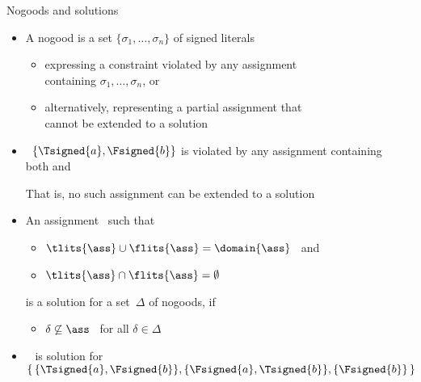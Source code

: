 \begin{frame}{Nogoods and solutions}
  \bigskip
  \begin{itemize}
  \item<2-> A \alert{nogood} is a set $\{\sigma_1,\ldots,\sigma_n\}$ of signed literals
    \begin{itemize}\normalsize
    \item<only@3-5> expressing a \alert{constraint} violated by any assignment
      \\containing $\sigma_1,\ldots,\sigma_n$, or
    \item<only@3-5> alternatively, representing a partial assignment that
      \\cannot be extended to a solution
      \medskip
    \end{itemize}
  \item<only@4 >  \ $\{\Tsigned{a},\Fsigned{b}\}$
    is violated by any assignment containing
    \\ both  and 
    \par\smallskip
    That is, no such assignment can be extended to a solution
  \item<only@5-> An assignment \ass\ such that
    \par\smallskip
    \begin{itemize}\normalsize
    \item \( \tlits{\ass} \cup \flits{\ass} = \domain{\ass} \) \ and
      \smallskip
    \item \( \tlits{\ass} \cap \flits{\ass} = \emptyset \)
    \end{itemize}
    \par\smallskip
    is a \alert{solution} for a set~$\Delta$ of nogoods,
    if
    \par\smallskip
    \begin{itemize}\normalsize
    \item $\delta\not\subseteq\ass$ \ for all $\delta\in\Delta$
    \end{itemize}
    \bigskip
  \item<only@7- >  \ 
    is  solution for
    \(
    \{\,\{\Tsigned{a},\Fsigned{b}\},\{\Fsigned{a},\Tsigned{b}\},\{\Fsigned{b}\}\,\}
    \)
  \end{itemize}
\end{frame}
